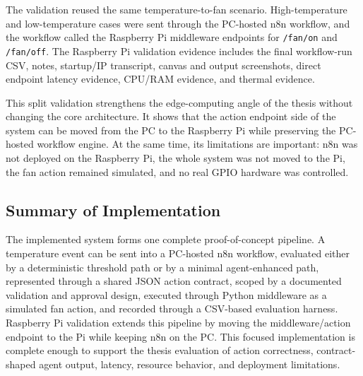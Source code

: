 The validation reused the same temperature-to-fan scenario. High-temperature and low-temperature cases were sent through the PC-hosted n8n workflow, and the workflow called the Raspberry Pi middleware endpoints for \texttt{/fan/on} and \texttt{/fan/off}. The Raspberry Pi validation evidence includes the final workflow-run CSV, notes, startup/IP transcript, canvas and output screenshots, direct endpoint latency evidence, CPU/RAM evidence, and thermal evidence.

This split validation strengthens the edge-computing angle of the thesis without changing the core architecture. It shows that the action endpoint side of the system can be moved from the PC to the Raspberry Pi while preserving the PC-hosted workflow engine. At the same time, its limitations are important: n8n was not deployed on the Raspberry Pi, the whole system was not moved to the Pi, the fan action remained simulated, and no real GPIO hardware was controlled.

\subsection{Summary of Implementation}\label{subsec:implementation-summary}

The implemented system forms one complete proof-of-concept pipeline. A temperature event can be sent into a PC-hosted n8n workflow, evaluated either by a deterministic threshold path or by a minimal agent-enhanced path, represented through a shared JSON action contract, scoped by a documented validation and approval design, executed through Python middleware as a simulated fan action, and recorded through a CSV-based evaluation harness. Raspberry Pi validation extends this pipeline by moving the middleware/action endpoint to the Pi while keeping n8n on the PC. This focused implementation is complete enough to support the thesis evaluation of action correctness, contract-shaped agent output, latency, resource behavior, and deployment limitations.
